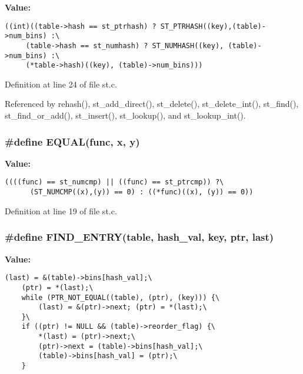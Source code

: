 \textbf{Value:}

\begin{Code}\begin{verbatim}((int)((table->hash == st_ptrhash) ? ST_PTRHASH((key),(table)->num_bins) :\
     (table->hash == st_numhash) ? ST_NUMHASH((key), (table)->num_bins) :\
     (*table->hash)((key), (table)->num_bins)))
\end{verbatim}\end{Code}


Definition at line 24 of file st.c.

Referenced by rehash(), st\_\-add\_\-direct(), st\_\-delete(), st\_\-delete\_\-int(), st\_\-find(), st\_\-find\_\-or\_\-add(), st\_\-insert(), st\_\-lookup(), and st\_\-lookup\_\-int().
\subsubsection{\setlength{\rightskip}{0pt plus 5cm}\#define EQUAL(func, x, y)}\label{st_8c_df137c378b35c2dbab9579eeb5c03150}


\textbf{Value:}

\begin{Code}\begin{verbatim}((((func) == st_numcmp) || ((func) == st_ptrcmp)) ?\
      (ST_NUMCMP((x),(y)) == 0) : ((*func)((x), (y)) == 0))
\end{verbatim}\end{Code}


Definition at line 19 of file st.c.
\subsubsection{\setlength{\rightskip}{0pt plus 5cm}\#define FIND\_\-ENTRY(table, hash\_\-val, key, ptr, last)}\label{st_8c_9fc5c02ec598b362bd1fd5ddb6442731}


\textbf{Value:}

\begin{Code}\begin{verbatim}(last) = &(table)->bins[hash_val];\
    (ptr) = *(last);\
    while (PTR_NOT_EQUAL((table), (ptr), (key))) {\
        (last) = &(ptr)->next; (ptr) = *(last);\
    }\
    if ((ptr) != NULL && (table)->reorder_flag) {\
        *(last) = (ptr)->next;\
        (ptr)->next = (table)->bins[hash_val];\
        (table)->bins[hash_val] = (ptr);\
    }
\end{verbatim}\end{Code}


